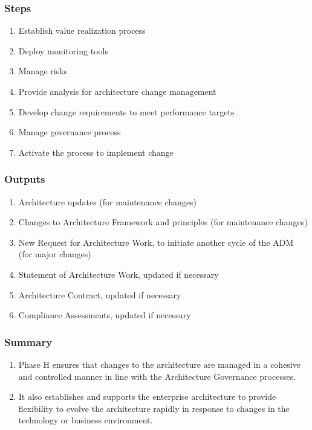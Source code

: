 \documentclass[aspectratio=169, table]{beamer}
\begin{document}
	
	\begin{frame}
		\frametitle{Steps}
		\vspace{20pt}
		\begin{enumerate}
			\item Establish value realization process
			\item Deploy monitoring tools
			\item Manage risks
			\item Provide analysis for architecture change management
			\item Develop change requirements to meet performance targets
			\item Manage governance process
			\item Activate the process to implement change
		\end{enumerate}
	\end{frame}
	
	\begin{frame}
		\frametitle{Outputs}
		\vspace{22pt}
		\begin{enumerate}
			\item Architecture updates (for maintenance changes)
			\item Changes to Architecture Framework and principles (for maintenance changes)
			\item New Request for Architecture Work, to initiate another cycle of the ADM (for major changes)
			\item Statement of Architecture Work, updated if necessary
			\item Architecture Contract, updated if necessary
			\item Compliance Assessments, updated if necessary
		\end{enumerate}
	\end{frame}
	
	
	
	\begin{frame}
		\frametitle{Summary}
		\begin{enumerate}
			\item Phase H ensures that changes to the architecture are managed in a cohesive and controlled manner in line with the Architecture Governance processes.
			\item It also establishes and supports the enterprise architecture to provide flexibility to evolve the architecture rapidly in response to changes in the technology or business environment.
		\end{enumerate}
		
		
	\end{frame}
	
\end{document}
